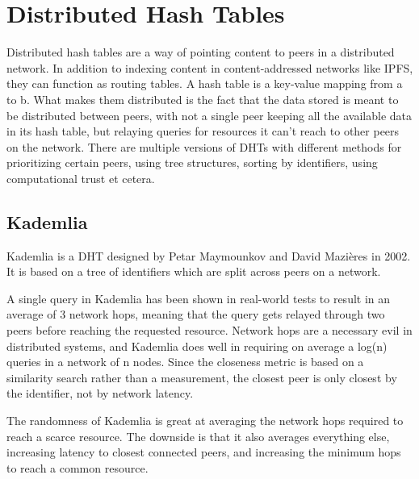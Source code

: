 \section{Distributed Hash Tables}
Distributed hash tables are a way of pointing content to peers in a distributed network. In addition to indexing content in content-addressed networks like IPFS, they can function as routing tables. A hash table is a key-value mapping from a to b. What makes them distributed is the fact that the data stored is meant to be distributed between peers, with not a single peer keeping all the available data in its hash table, but relaying queries for resources it can't reach to other peers on the network. There are multiple versions of DHTs with different methods for prioritizing certain peers, using tree structures, sorting by identifiers, using computational trust et cetera. 
						
\subsection{Kademlia}
Kademlia is a DHT designed by Petar Maymounkov and David Mazières in 2002. It is based on a tree of identifiers which are split across peers on a network.
						
A single query in Kademlia has been shown in real-world tests to result in an average of 3 network hops, meaning that the query gets relayed through two peers before reaching the requested resource.\cite{Roos2013-mb} Network hops are a necessary evil in distributed systems, and Kademlia does well in requiring on average a log(n) queries in a network of n nodes. Since the closeness metric is based on a similarity search rather than a measurement, the closest peer is only closest by the identifier, not by network latency.\cite{Eigenmann2020-zm}
						
The randomness of Kademlia is great at averaging the network hops required to reach a scarce resource. The downside is that it also averages everything else, increasing latency to closest connected peers, and increasing the minimum hops to reach a common resource.
